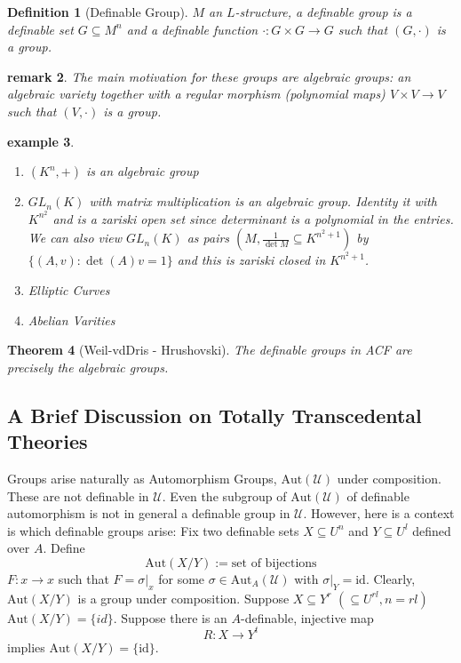 \documentclass[letterpaper, 12pt]{article}
\newcommand{\fin}{\qquad \quad \hfill \framebox[1.75mm][l]{\,}}
\newcommand{\cU}{\mathcal{U}}
\newcommand{\Aut}{\mbox{Aut}}
\theoremstyle{stdthm}
\newtheorem{thm}{Theorem}[section]
\theoremstyle{stddef}
\newtheorem{defn}[thm]{Definition}
\newtheorem{rem}[thm]{remark} %
\newtheorem{eg}[thm]{example} %
\theoremstyle{stdnonum}
\theoremstyle{stdqands}
\theoremstyle{stdbold}
\begin{document}
\begin{defn} [Definable Group]
$M$ an $L$-structure, a definable group is a definable set $G \subseteq M^n$ and  a definable function $\cdot: G\times G \to G$ such that $(G,\cdot)$ is a group. 
\end{defn}

\begin{rem}
The main motivation for these groups are algebraic groups: an algebraic variety together with a regular morphism (polynomial maps) $V\times V \to V$ such that $(V,\cdot)$ is a group. 
\end{rem}

\begin{eg}
\begin{enumerate}
\item $(K^n, +)$ is an algebraic group
\item $GL_n(K)$ with matrix multiplication is an algebraic group. Identity it with $K^{n^2}$  and is a zariski open set since determinant is a polynomial in the entries.  We can also view $GL_n(K)$ as pairs $(M, \frac{1}{\det M} \subseteq K^{n^2 + 1})$ by $\{(A,v): \det(A)v = 1\}$ and this is zariski closed in $K^{n^2 + 1}$.
\item Elliptic Curves
\item Abelian Varities 
\end{enumerate}

\end{eg}

\begin{thm} [Weil-vdDris - Hrushovski] The definable groups in ACF are precisely the algebraic groups. 

\end{thm}


\subsection*{A Brief Discussion on Totally Transcedental Theories}
Groups arise naturally as Automorphism Groups, $\Aut(\cU)$ under composition. These are not definable in $\cU$. Even the subgroup of $\Aut(\cU)$ of definable automorphism is not in general a definable group in $\cU$. However, here is a context is which definable groups arise: Fix two definable sets $X \subseteq U^n$ and $Y \subseteq U^l$ defined over $A$. Define 
\[ \Aut(X/Y) := \mbox{set of bijections} \]
$F:x \to x$ such that $F = \sigma|_x$ for some $\sigma \in \Aut_A(\cU)$ with $\sigma|_Y = \mbox{id}$. Clearly, $\Aut(X/Y)$ is a group under composition. Suppose $X \subseteq Y^r$ $(\subseteq U^{rl}, n= rl)$ $\Aut(X/Y) = \{id\}$. Suppose there is an $A$-definable, injective map 
\[ R: X\to Y^t \]
implies $\Aut(X/Y) = \{\mbox{id}\}$. 
\end{document}
